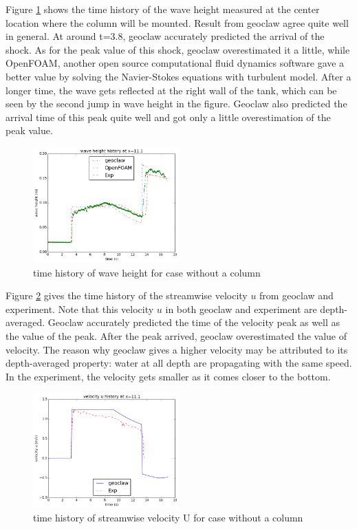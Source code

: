 \documentclass[11pt]{article}
\begin{document}
Figure \ref{fig:waveheight_nocolumn} shows the time history of the wave height measured at the center location where the column will be mounted. 
Result from geoclaw agree quite well in general. At around t=3.8, geoclaw accurately predicted the arrival of the shock. 
As for the peak value of this shock, geoclaw overestimated it a little, while OpenFOAM, another open source computational fluid dynamics software gave a better value by solving the Navier-Stokes equations with turbulent model.
After a longer time, the wave gets reflected at the right wall of the tank, which can be seen by the second jump in wave height in the figure. 
Geoclaw also predicted the arrival time of this peak quite well and got only a little overestimation of the peak value.
\begin{figure}[h!]
    \centering
    \includegraphics[width=0.5\textwidth]{../../dambreak/myplot/waveheight_nocolumn}
    \caption{time history of wave height for case without a column}
    \label{fig:waveheight_nocolumn}
\end{figure}

Figure \ref{fig:velocityU_nocolumn} gives the time history of the streamwise velocity $u$ from geoclaw and experiment. 
Note that this velocity $u$ in both geoclaw and experiment are depth-averaged. 
Geoclaw accurately predicted the time of the velocity peak as well as the value of the peak. 
After the peak arrived, geoclaw overestimated the value of velocity.
The reason why geoclaw gives a higher velocity may be attributed to its depth-averaged property: water at all depth are propagating with the same speed. In the experiment, the velocity gets smaller as it comes closer to the bottom. 
\begin{figure}[h!]
    \centering
    \includegraphics[width=0.5\textwidth]{../../dambreak/myplot/velocityU_nocolumn}
    \caption{time history of streamwise velocity U for case without a column}
    \label{fig:velocityU_nocolumn}
\end{figure}
\end{document}
